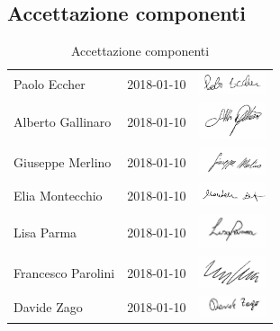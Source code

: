 	\subsection{Accettazione componenti}
		\begin{table}[H]
		\centering
		\begin{tabular}{|p{4cm}|C{4cm}|C{5cm}|}
			\hline
			 & & \\
			\hline			
			Paolo Eccher & 2018-01-10 & \includegraphics[width=2cm]{../../CommonImages/firme/paolo.png}  \\
			\hline
			Alberto Gallinaro & 2018-01-10 & \includegraphics[width=2cm]{../../CommonImages/firme/alberto.png} \\
			\hline
			Giuseppe Merlino & 2018-01-10 & \includegraphics[width=2cm]{../../CommonImages/firme/giuseppe.png} \\
			\hline
			Elia Montecchio & 2018-01-10 & \includegraphics[width=2cm]{../../CommonImages/firme/elia.png} \\
			\hline
			Lisa Parma & 2018-01-10 & \includegraphics[width=2cm]{../../CommonImages/firme/lisa.png} \\
			\hline
			Francesco Parolini & 2018-01-10 & \includegraphics[width=2cm]{../../CommonImages/firme/freppo.png} \\
			\hline
			Davide Zago & 2018-01-10 & \includegraphics[width=2cm]{../../CommonImages/firme/davide.png} \\
			\hline
		\end{tabular}
		\caption{Accettazione componenti}
	\end{table}

